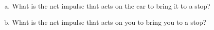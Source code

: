 \label{fnt7.1.1-5}


\begin{enumerate}[(a)]
	\item What is the net impulse that acts on the car to bring it to a stop?
	\item What is the net impulse that acts on you to bring you to a stop?
\end{enumerate}